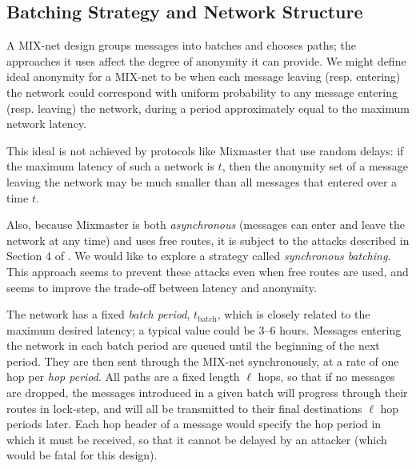 \documentclass{llncs}
\begin{document}
\subsection{Batching Strategy and Network Structure}
\label{subsec:batching}


A MIX-net design groups messages into batches and chooses paths; the
approaches it uses affect the degree of anonymity it can provide. We
might define ideal anonymity for a MIX-net to be when each message leaving
(resp. entering) the network could correspond with uniform probability
to any message entering (resp. leaving) the network, during a period
approximately equal to the maximum network latency.

This ideal is not achieved by protocols like Mixmaster that use random
delays: if the maximum latency of such a network is $t$, then the
anonymity set of a message leaving the network may be much smaller
than all messages that entered over a time $t$.

Also, because Mixmaster is both {\em asynchronous} (messages can enter and
leave the network at any time) and uses free routes, it is subject to
the attacks described in Section 4 of \cite{disad-free-routes}.
We would like to explore a
strategy called {\em synchronous batching}. This approach seems to prevent
these attacks even when free routes are used, and seems to improve the
trade-off between latency and anonymity.

The network has a fixed {\em batch period}, $t_\mathrm{batch}$, which is closely
related to the maximum desired latency; a typical value could be 3--6 hours.
Messages entering the network in each batch period are queued until
the beginning of the next period. They are then sent through the MIX-net
synchronously, at a rate of one hop per {\em hop period}. All paths are
a fixed length $\ell$ hops, so that if no messages are dropped, the messages
introduced in a given batch will progress through their routes in
lock-step, and will all be transmitted to their final destinations $\ell$
hop periods later. Each hop header of a message would specify the hop
period in which it must be received, so that it cannot be delayed by an
attacker (which would be fatal for this design).
\end{document}
